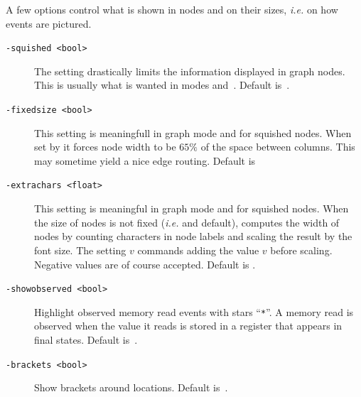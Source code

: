 A few options control what is shown in nodes
and on their sizes, \emph{i.e.}
on how events are pictured.
\begin{description}
\item[{\tt -squished <bool>}] The setting  drastically
limits the information displayed in graph nodes. This is usually what
is wanted in modes  and~. Default is~.
\item[{\tt -fixedsize <bool>}] This setting is meaningfull in
 graph mode and for squished nodes. When set by
 it forces node width to be $65\%$ of the space
between columns. This may sometime yield a nice edge routing. Default is~
\item[{\tt -extrachars <float>}] This setting is meaningful in
 graph mode and for squished nodes.
When the size of nodes is not fixed (\emph{i.e.}  and default), \herd{} computes the width of nodes by counting characters in node
labels and scaling the result by the font size.
The setting $v$ commands adding the value $v$ before scaling.
Negative values are of course accepted. Default is .
\item[{\tt -showobserved <bool>}] Highlight observed memory read events with
stars ``\texttt{*}''. A memory read is observed when the value it reads
is stored in a register that appears in final states.
Default is~.
\item[{\tt -brackets <bool>}] Show brackets around locations. Default
is~.
\end{description}


